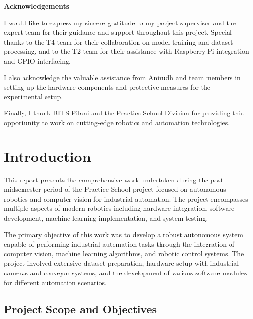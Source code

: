 \documentclass{book}
\begin{document}
	\newpage
	\centerline{\bf \Large Acknowledgements}
	\vspace*{0.5cm}
		\par\noindent I would like to express my sincere gratitude to my project supervisor and the expert team for their guidance and support throughout this project. Special thanks to the T4 team for their collaboration on model training and dataset processing, and to the T2 team for their assistance with Raspberry Pi integration and GPIO interfacing.
		
		\par\noindent I also acknowledge the valuable assistance from Anirudh and team members in setting up the hardware components and protective measures for the experimental setup.
		
		\par\noindent Finally, I thank BITS Pilani and the Practice School Division for providing this opportunity to work on cutting-edge robotics and automation technologies.
		\vfill

		\par{}

\tableofcontents
\listoffigures
\listoftables

\chapter{Introduction}

\par\noindent This report presents the comprehensive work undertaken during the post-midsemester period of the Practice School project focused on autonomous robotics and computer vision for industrial automation. The project encompasses multiple aspects of modern robotics including hardware integration, software development, machine learning implementation, and system testing.

\par\noindent The primary objective of this work was to develop a robust autonomous system capable of performing industrial automation tasks through the integration of computer vision, machine learning algorithms, and robotic control systems. The project involved extensive dataset preparation, hardware setup with industrial cameras and conveyor systems, and the development of various software modules for different automation scenarios.

\section{Project Scope and Objectives}
\end{document}
